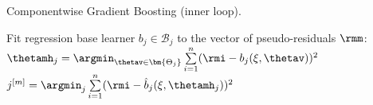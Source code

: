 \begin{algorithm}[H]
  \begin{footnotesize}
  \begin{center}
  \caption{Componentwise Gradient Boosting (inner loop).}
    \begin{algorithmic}[1]
        \setcounter{ALG@line}{3}

          \State Fit regression base learner $b_j \in \mathcal{B}_j$ to the vector of pseudo-residuals $\rmm$:
          \State $\thetamh_j = \argmin_{\thetav \in \bm{\Theta_j}} \sum  \limits_{i=1}^n
          (\rmi - b_j(\xi, \thetav))^2$
        \EndFor
        \State $j^{[m]} = \argmin_{j} \sum  \limits_{i=1}^n (\rmi - \hat{b}_j(\xi, \thetamh_j))^2$

    \end{algorithmic}
    \end{center}
    \end{footnotesize}
    \color{black}
\end{algorithm}